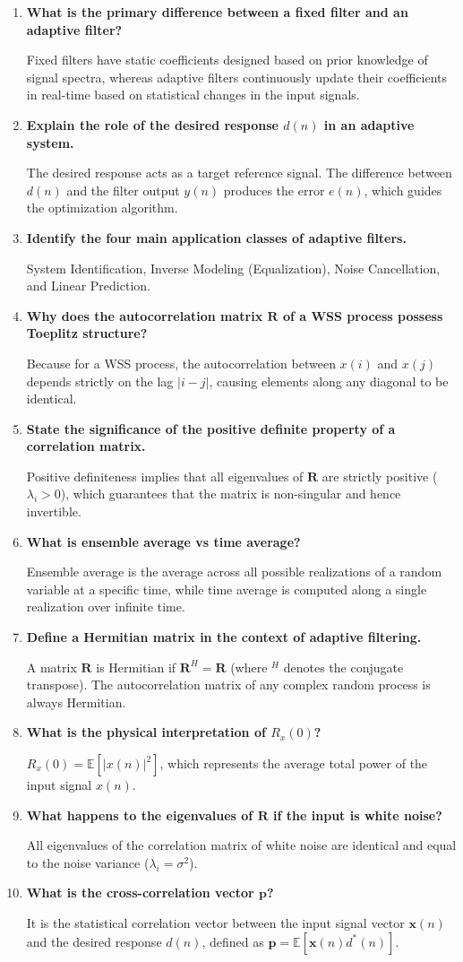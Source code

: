 \documentclass[12pt,a4paper]{article}
\newcommand{\Q}[1]{\textbf{#1}\par\noindent\ignorespaces}
\begin{document}
\begin{tcolorbox}[exambox, title={\textbf{Frequently Asked / Viva Questions}}]
\begin{enumerate}[topsep=0pt, label=\textbf{Q\arabic*.}, itemsep=5pt]
  \item \Q{What is the primary difference between a fixed filter and an adaptive filter?}
    Fixed filters have static coefficients designed based on prior knowledge of signal spectra, whereas adaptive filters continuously update their coefficients in real-time based on statistical changes in the input signals.
  \item \Q{Explain the role of the desired response $d(n)$ in an adaptive system.}
    The desired response acts as a target reference signal. The difference between $d(n)$ and the filter output $y(n)$ produces the error $e(n)$, which guides the optimization algorithm.
  \item \Q{Identify the four main application classes of adaptive filters.}
    System Identification, Inverse Modeling (Equalization), Noise Cancellation, and Linear Prediction.
  \item \Q{Why does the autocorrelation matrix $\mathbf{R}$ of a WSS process possess Toeplitz structure?}
    Because for a WSS process, the autocorrelation between $x(i)$ and $x(j)$ depends strictly on the lag $|i - j|$, causing elements along any diagonal to be identical.
  \item \Q{State the significance of the positive definite property of a correlation matrix.}
    Positive definiteness implies that all eigenvalues of $\mathbf{R}$ are strictly positive ($\lambda_i > 0$), which guarantees that the matrix is non-singular and hence invertible.
  \item \Q{What is ensemble average vs time average?}
    Ensemble average is the average across all possible realizations of a random variable at a specific time, while time average is computed along a single realization over infinite time.
  \item \Q{Define a Hermitian matrix in the context of adaptive filtering.}
    A matrix $\mathbf{R}$ is Hermitian if $\mathbf{R}^H = \mathbf{R}$ (where $^H$ denotes the conjugate transpose). The autocorrelation matrix of any complex random process is always Hermitian.
  \item \Q{What is the physical interpretation of $R_x(0)$?}
    $R_x(0) = \mathbb{E}[|x(n)|^2]$, which represents the average total power of the input signal $x(n)$.
  \item \Q{What happens to the eigenvalues of $\mathbf{R}$ if the input is white noise?}
    All eigenvalues of the correlation matrix of white noise are identical and equal to the noise variance ($\lambda_i = \sigma^2$).
  \item \Q{What is the cross-correlation vector $\mathbf{p}$?}
    It is the statistical correlation vector between the input signal vector $\mathbf{x}(n)$ and the desired response $d(n)$, defined as $\mathbf{p} = \mathbb{E}[\mathbf{x}(n) d^*(n)]$.
\end{enumerate}
\end{tcolorbox}
\end{document}

